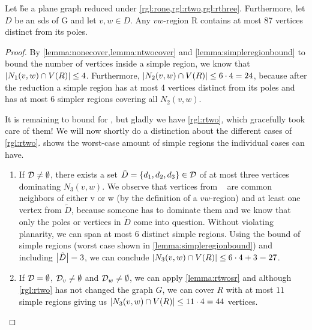 \begin{lemma}\label{lemma:inside}
    Let \G be a plane graph reduced under \cref{rgl:rone,rgl:rtwo,rgl:rthree}. Furthermore, let $D$ be an sds of G and let $v,w \in D$. Any $vw$-region R contains at most 87 vertices distinct from its poles.
\end{lemma}
\begin{proof} 
    By \cref{lemma:nonecover,lemma:ntwocover} and \cref{lemma:simpleregionbound} to bound the number of vertices inside a simple region, we know that $\abs{N_1(v,w) \cap V(R)} \leq 4$. Furthermore, $\abs{N_2(v,w) \cap V(R)} \leq 6 \cdot 4 = 24$, because after the reduction a simple region has at most 4 vertices distinct from its poles and has at most 6 simpler regions covering all $N_2(v, w)$.
    
    It is remaining to bound for \nthi, but gladly we have \cref{rgl:rtwo}, which gracefully took care of them! We will now shortly do a distinction about the different cases of \cref{rgl:rtwo}.  shows the worst-case amount of simple regions the individual cases can have.
    
    \begin{caseofz}

        \begin{enumerate}
            \item If $\mathcal{D} \neq \emptyset$, there exists a set $\tilde D = \{d_1,d_2,d_3\} \in \mathcal{D}$ of at most three vertices dominating $N_3(v,w)$. We observe that vertices from \nthi~ are common neighbors of either v or w (by the definition of a $vw$-region) and at least one vertex from $\tilde D$, because someone has to dominate them and we know that only the poles or vertices in $\tilde D$ come into question.
            Without violating planarity, we can span at most 6 distinct simple regions. Using the bound of simple regions (worst case shown in \cref{lemma:simpleregionbound}) and including $\abs{\tilde D} = 3$, we can conclude $\abs{N_3(v,w) \cap V(R)} \leq 6 \cdot 4 + 3 = 27$.
            \item If $\mathcal{D} = \emptyset$, $\mathcal{D}_{v} \neq \emptyset$ and $\mathcal{D}_{w} \neq \emptyset$, we can apply \cref{lemma:rtwosr} and although \cref{rgl:rtwo} has not changed the graph $G$, we can cover $R$ with at most $11$ simple regions giving us $\abs{N_3(v,w) \cap V(R)} \leq 11 \cdot 4 = 44$ vertices.
        \end{enumerate}
        

\end{caseofz}
\end{proof}
